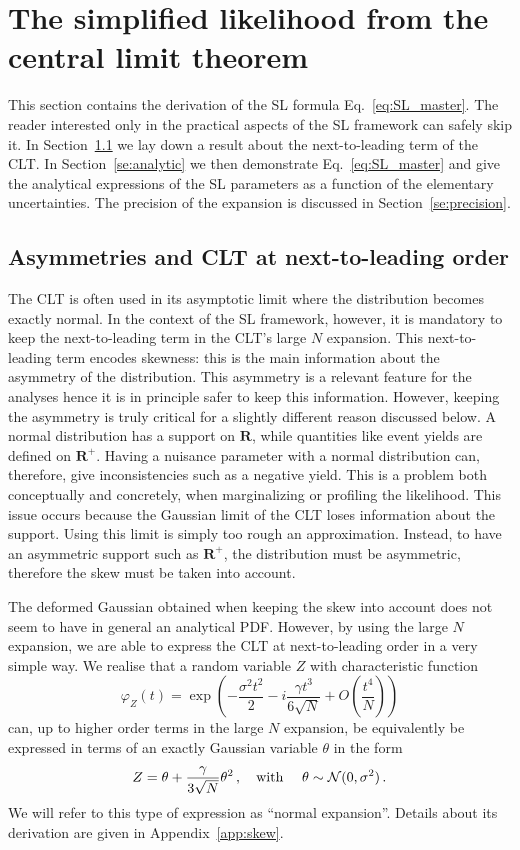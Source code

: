 \documentclass[11pt]{article}
\newcommand{\be}{\begin{equation}}
\newcommand{\ee}{\end{equation}}
\begin{document}
\section{The simplified likelihood from the central limit theorem}
\label{se:SL_theory}

This section contains the derivation of the SL formula Eq.~\eqref{eq:SL_master}.
The reader interested only in the practical aspects of the SL framework can safely skip it. In Section~\ref{se:skew_CLT} we lay down a  result about the next-to-leading term of the CLT. In Section~\ref{se:analytic} we then demonstrate Eq.~\eqref{eq:SL_master} and give the analytical expressions of the SL parameters as a function of the elementary uncertainties. The precision of the expansion is discussed in Section~\ref{se:precision}. 

\subsection{Asymmetries and CLT at next-to-leading order}
\label{se:skew_CLT}

The CLT is often used in its asymptotic limit where the distribution becomes exactly normal. In the context of the SL framework, however, it is mandatory to keep the next-to-leading  term in the CLT's large $N$ expansion. This next-to-leading term encodes skewness: this is the main information about the asymmetry of the distribution. This asymmetry is a relevant feature for the analyses hence it is in principle safer to keep this information. However, keeping the asymmetry is truly critical for a slightly different reason discussed below. A normal distribution has a support on $\mathbf{R}$, while quantities like event yields are defined on $\mathbf{R}^+$. Having a nuisance parameter with a normal distribution can, therefore, give inconsistencies such as a negative yield. This is a problem both conceptually and concretely, when marginalizing or profiling the likelihood. This issue occurs because the Gaussian limit of the CLT loses information about the support. Using this limit is simply too rough an approximation. Instead, to have an asymmetric support such as $\mathbf{R}^+$,  the distribution must be asymmetric, therefore the skew must be taken into account.


The deformed Gaussian obtained when keeping the skew into account does not seem to have in general an analytical PDF. 
However, by using the large $N$ expansion, we are able to express the CLT at next-to-leading order in a very simple way. 
We realise that a random variable $Z$ with characteristic function
\be
\varphi_Z(t)=\exp\left(-\frac{\sigma^2 t^2}{2}-i \frac{\gamma t^3}{6 \sqrt{N}} +O\left(\frac{t^4}{N}\right)\right) \label{eq:CF_CLT}
 \ee
can, up to higher order terms in the large $N$ expansion, be equivalently be expressed in terms of an exactly Gaussian variable $\theta$ in the form
\be
Z= \theta+\frac{\gamma}{3\sqrt{N}}\theta^2\,,  \quad \textrm{with } \quad \theta\sim{\cal N}(0,\sigma^2)\,. \label{eq:ZskewCLT}
\ee
We will refer to this type of expression as ``normal expansion''. Details about its derivation are given in Appendix~\ref{app:skew}.
\end{document}
